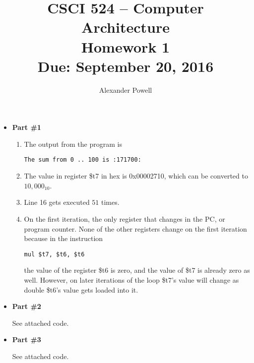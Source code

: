 \documentclass[10pt]{article} %
\title{CSCI 524 -- Computer Architecture \\
Homework 1 \\
{\large{\bf Due: September 20, 2016}}}
\date{}
\author{Alexander Powell}
\begin{document}
\maketitle
\begin{itemize}

\item %

\textbf{Part \#1}

\begin{enumerate}
\item 

The output from the program is \begin{verbatim}The sum from 0 .. 100 is :171700:\end{verbatim}

\item 

The value in register \$t7 in hex is 0x00002710, which can be converted to $10,000_{10}$.  

\item 

Line 16 gets executed $51$ times.  

\item 

On the first iteration, the only register that changes in the PC, or program counter.  None of the other registers change on the first iteration because in the instruction \begin{verbatim}mul $t7, $t6, $t6\end{verbatim} the value of the register \$t6 is zero, and the value of \$t7 is already zero as well.  However, on later iterations of the loop \$t7's value will change as double \$t6's value gets loaded into it.  

\end{enumerate}

\item %

\textbf{Part \#2}

See attached code.  

\item %

\textbf{Part \#3}

See attached code.

\end{itemize}
\end{document}
